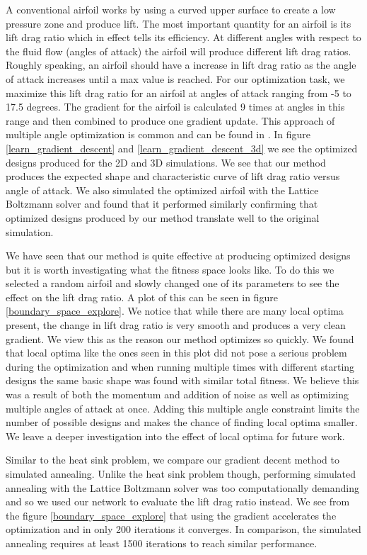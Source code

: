 \documentclass{article} %
\begin{document}
A conventional airfoil works by using a curved upper surface to create a low pressure zone and produce lift. The most important quantity for an airfoil is its lift drag ratio which in effect tells its efficiency. At different angles with respect to the fluid flow (angles of attack) the airfoil will produce different lift drag ratios. Roughly speaking, an airfoil should have a increase in lift drag ratio as the angle of attack increases until a max value is reached. For our optimization task, we maximize this lift drag ratio for an airfoil at angles of attack ranging from -5 to 17.5 degrees. The gradient for the airfoil is calculated 9 times at angles in this range and then combined to produce one gradient update. This approach of multiple angle optimization is common and can be found in \citet{drela1998pros}. In figure \ref{learn_gradient_descent} and \ref{learn_gradient_descent_3d} we see the optimized designs produced for the 2D and 3D simulations. We see that our method produces the expected shape and characteristic curve of lift drag ratio versus angle of attack. We also simulated the optimized airfoil with the Lattice Boltzmann solver and found that it performed similarly confirming that optimized designs produced by our method translate well to the original simulation.

We have seen that our method is quite effective at producing optimized designs but it is worth investigating what the fitness space looks like. To do this we selected a random airfoil and slowly changed one of its parameters to see the effect on the lift drag ratio. A plot of this can be seen in figure \ref{boundary_space_explore}. We notice that while there are many local optima present, the change in lift drag ratio is very smooth and produces a very clean gradient. We view this as the reason our method optimizes so quickly. We found that local optima like the ones seen in this plot did not pose a serious problem during the optimization and when running multiple times with different starting designs the same basic shape was found with similar total fitness. We believe this was a result of both the momentum and addition of noise as well as optimizing multiple angles of attack at once. Adding this multiple angle constraint limits the number of possible designs and makes the chance of finding local optima smaller. We leave a deeper investigation into the effect of local optima for future work.

Similar to the heat sink problem, we compare our gradient decent method to simulated annealing. Unlike the heat sink problem though, performing simulated annealing with the Lattice Boltzmann solver was too computationally demanding and so we used our network to evaluate the lift drag ratio instead. We see from the figure \ref{boundary_space_explore} that using the gradient accelerates the optimization and in only 200 iterations it converges. In comparison, the simulated annealing requires at least 1500 iterations to reach similar performance.
\end{document}
